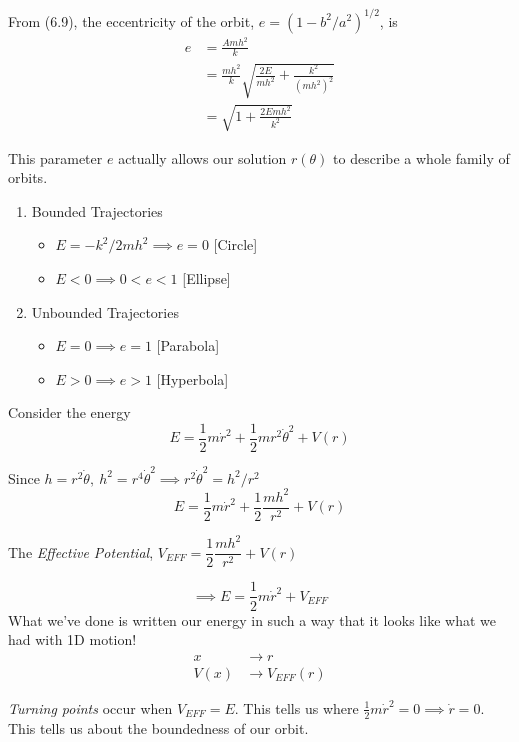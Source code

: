 \documentclass[twoside]{scrartcl}
\begin{document}
From (6.9), the eccentricity of the orbit, $e = (1-b^2/a^2)^{1/2}$, is
\[
\begin{aligned}
e &= \frac{Amh^2}{k}\\ 
&= \frac{mh^2}{k}\sqrt{\frac{2E}{mh^2} + \frac{k^2}{(mh^2)^2} }\\
&= \sqrt{1 + \frac{2Emh^2}{k^2}}	
\end{aligned}
\]
	

This parameter $e$ actually allows our solution $r(\theta)$ to describe a whole family of orbits. 
\begin{examples}
\begin{enumerate}
\item Bounded Trajectories
\begin{itemize}
\item $E = -k^2/2mh^2 \implies e = 0$ [Circle] 	
\item $E < 0 \implies 0 < e < 1$ [Ellipse]
\end{itemize}

\item Unbounded Trajectories
\begin{itemize}
\item $E = 0 \implies e = 1$ [Parabola]
\item $E > 0 \implies e > 1$ [Hyperbola]	
\end{itemize}

\end{enumerate}
\end{examples}
\pagebreak

Consider  the energy 
\[E = \frac{1}{2}m\dot{r}^2 + \frac{1}{2}mr^2\dot{\theta}^2 + V(r)\]

Since $h = r^2\dot{\theta},~ h^2 = r^4\dot{\theta}^2 \implies r^2\dot{\theta}^2 = h^2/r^2$
\[E = \frac{1}{2}m\dot{r}^2 + \frac{1}{2}\frac{mh^2}{r^2} + V(r)\]

\begin{definition}
The \emph{Effective Potential}, $V_{EFF} =\dfrac{1}{2}\dfrac{mh^2}{r^2} + V(r)$	
\end{definition}
\[\implies E = \frac{1}{2}m\dot{r}^2 + V_{EFF}\]
What we've done is written our energy in such a way that it looks like what we had with 1D motion! 
\[\begin{aligned}x &\longrightarrow r \\
V(x) &\longrightarrow V_{EFF}(r)
\end{aligned}
\]

\begin{definition} \emph{Turning points} occur when $V_{EFF} = E$. This tells us where $\frac{1}{2}m\dot{r}^2 = 0 \implies \dot{r} = 0$. This tells us about the boundedness of our orbit. 

\end{definition}
\end{document}
